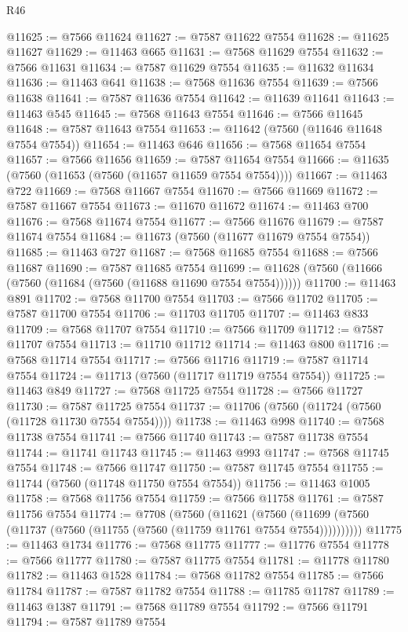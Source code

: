 \begin{lexlean}{R46}
\begin{coremodule}
@11625 := @7566 @11624
@11627 := @7587 @11622 @7554
@11628 := @11625 @11627
@11629 := @11463 @665
@11631 := @7568 @11629 @7554
@11632 := @7566 @11631
@11634 := @7587 @11629 @7554
@11635 := @11632 @11634
@11636 := @11463 @641
@11638 := @7568 @11636 @7554
@11639 := @7566 @11638
@11641 := @7587 @11636 @7554
@11642 := @11639 @11641
@11643 := @11463 @545
@11645 := @7568 @11643 @7554
@11646 := @7566 @11645
@11648 := @7587 @11643 @7554
@11653 := @11642 (@7560 (@11646 @11648 @7554 @7554))
@11654 := @11463 @646
@11656 := @7568 @11654 @7554
@11657 := @7566 @11656
@11659 := @7587 @11654 @7554
@11666 := @11635 (@7560 (@11653 (@7560 (@11657 @11659 @7554 @7554))))
@11667 := @11463 @722
@11669 := @7568 @11667 @7554
@11670 := @7566 @11669
@11672 := @7587 @11667 @7554
@11673 := @11670 @11672
@11674 := @11463 @700
@11676 := @7568 @11674 @7554
@11677 := @7566 @11676
@11679 := @7587 @11674 @7554
@11684 := @11673 (@7560 (@11677 @11679 @7554 @7554))
@11685 := @11463 @727
@11687 := @7568 @11685 @7554
@11688 := @7566 @11687
@11690 := @7587 @11685 @7554
@11699 := @11628 (@7560 (@11666 (@7560 (@11684 (@7560 (@11688 @11690 @7554 @7554))))))
@11700 := @11463 @891
@11702 := @7568 @11700 @7554
@11703 := @7566 @11702
@11705 := @7587 @11700 @7554
@11706 := @11703 @11705
@11707 := @11463 @833
@11709 := @7568 @11707 @7554
@11710 := @7566 @11709
@11712 := @7587 @11707 @7554
@11713 := @11710 @11712
@11714 := @11463 @800
@11716 := @7568 @11714 @7554
@11717 := @7566 @11716
@11719 := @7587 @11714 @7554
@11724 := @11713 (@7560 (@11717 @11719 @7554 @7554))
@11725 := @11463 @849
@11727 := @7568 @11725 @7554
@11728 := @7566 @11727
@11730 := @7587 @11725 @7554
@11737 := @11706 (@7560 (@11724 (@7560 (@11728 @11730 @7554 @7554))))
@11738 := @11463 @998
@11740 := @7568 @11738 @7554
@11741 := @7566 @11740
@11743 := @7587 @11738 @7554
@11744 := @11741 @11743
@11745 := @11463 @993
@11747 := @7568 @11745 @7554
@11748 := @7566 @11747
@11750 := @7587 @11745 @7554
@11755 := @11744 (@7560 (@11748 @11750 @7554 @7554))
@11756 := @11463 @1005
@11758 := @7568 @11756 @7554
@11759 := @7566 @11758
@11761 := @7587 @11756 @7554
@11774 := @7708
    (@7560
      (@11621
        (@7560 (@11699 (@7560 (@11737 (@7560 (@11755 (@7560 (@11759 @11761 @7554 @7554))))))))))
@11775 := @11463 @1734
@11776 := @7568 @11775
@11777 := @11776 @7554
@11778 := @7566 @11777
@11780 := @7587 @11775 @7554
@11781 := @11778 @11780
@11782 := @11463 @1528
@11784 := @7568 @11782 @7554
@11785 := @7566 @11784
@11787 := @7587 @11782 @7554
@11788 := @11785 @11787
@11789 := @11463 @1387
@11791 := @7568 @11789 @7554
@11792 := @7566 @11791
@11794 := @7587 @11789 @7554

\end{coremodule}
\end{lexlean}
